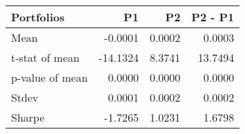 \begin{tabular}{lrrr}
\toprule
Portfolios & P1 & P2 & P2 - P1 \\
\midrule
Mean & -0.0001 & 0.0002 & 0.0003 \\
t-stat of mean & -14.1324 & 8.3741 & 13.7494 \\
p-value of mean & 0.0000 & 0.0000 & 0.0000 \\
Stdev & 0.0001 & 0.0002 & 0.0002 \\
Sharpe & -1.7265 & 1.0231 & 1.6798 \\
\bottomrule
\end{tabular}

